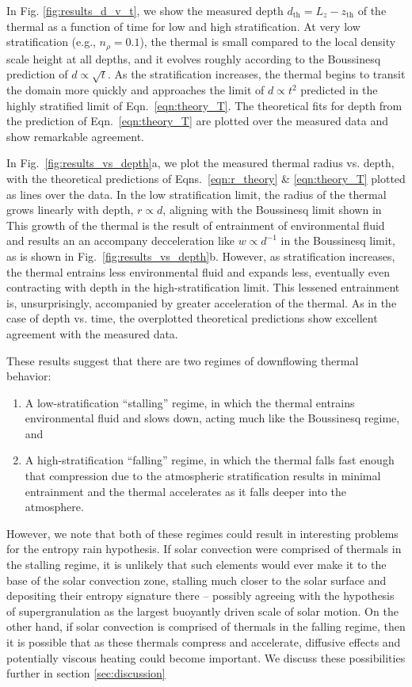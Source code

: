 \documentclass[twocolumn, amsmath, amsfonts, amssymb, trackchanges]{aastex62}
\begin{document}
In Fig. \ref{fig:results_d_v_t}, we show the measured depth $d_{\text{th}} = L_z - z_{\text{th}}$
of the thermal as a function of time for low and high stratification. 
At very low stratification
(e.g., $n_\rho = 0.1$), the thermal is small compared to the local density scale height at all depths,
and it evolves roughly according to the Boussinesq prediction of $d \propto \sqrt{t}$. As the stratification
increases, 
the thermal begins to transit the domain more quickly and approaches the limit of 
$d \propto t^2$ predicted in the highly stratified limit of Eqn.~\ref{eqn:theory_T}. The
theoretical fits for depth from the prediction of Eqn.~\ref{eqn:theory_T} are plotted over
the measured data and show remarkable agreement.

In Fig.~\ref{fig:results_vs_depth}a, we plot the measured thermal radius vs. depth, with the
theoretical predictions of Eqns.~\ref{eqn:r_theory} \& \ref{eqn:theory_T} plotted as lines
over the data. In the low stratification limit, the radius of the thermal grows linearly with
depth, $r \propto d$, aligning with the Boussinesq limit shown in \citet{lecoanet&jeevanjee2018} 
This growth of the thermal is the result of entrainment of environmental fluid and
results an an accompany decceleration like $w \propto d^{-1}$ in the Boussinesq limit, 
as is shown in Fig.~\ref{fig:results_vs_depth}b.
However, as stratification increases, the thermal entrains less environmental fluid and
expands less, eventually even contracting with depth in the high-stratification limit. 
This lessened entrainment is, unsurprisingly, accompanied by greater acceleration of the thermal.
As in the case of depth vs. time, the overplotted theoretical predictions show excellent
agreement with the measured data.

These results suggest that there are two regimes of downflowing thermal behavior:
\begin{enumerate}
\item A low-stratification ``stalling'' regime, in which the thermal entrains environmental
fluid and slows down, acting much like the Boussinesq regime, and
\item A high-stratification ``falling'' regime, in which the thermal falls fast enough
that compression due to the atmospheric stratification results in minimal entrainment and
the thermal accelerates as it falls deeper into the atmosphere.
\end{enumerate}
However, we note that both of these regimes could result in interesting problems for the
entropy rain hypothesis. If solar convection were comprised of thermals in the stalling regime,
it is unlikely that such elements would ever make it to the base of the solar convection zone, 
stalling much closer to the solar surface and depositing their entropy signature there -- possibly
agreeing with the hypothesis of supergranulation as the largest buoyantly driven scale of
solar motion. On the other hand, if solar convection is comprised of thermals in the falling
regime, then it is possible that as these thermals compress and accelerate, diffusive effects
and potentially viscous heating could become important. We discuss these possibilities further
in section \ref{sec:discussion}
\end{document}
